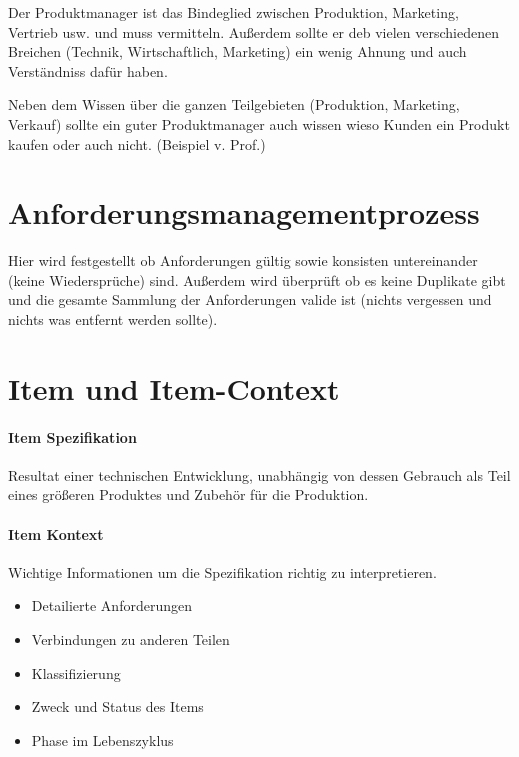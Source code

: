 
Der Produktmanager ist das Bindeglied zwischen Produktion, Marketing, Vertrieb usw. und muss vermitteln. Außerdem sollte er deb vielen verschiedenen Breichen (Technik, Wirtschaftlich, Marketing) ein wenig Ahnung und auch Verständniss dafür haben.


Neben dem Wissen über die ganzen Teilgebieten (Produktion, Marketing, Verkauf) sollte ein guter Produktmanager auch wissen wieso Kunden ein Produkt kaufen oder auch nicht. (Beispiel v. Prof.)

\section{Anforderungsmanagementprozess}
Hier wird festgestellt ob Anforderungen gültig sowie konsisten untereinander (keine Wiedersprüche) sind. Außerdem wird überprüft ob es keine Duplikate gibt und die gesamte Sammlung der Anforderungen valide ist (nichts vergessen und nichts was entfernt werden sollte).


\section{Item und Item-Context}

\paragraph{Item Spezifikation}
Resultat einer technischen Entwicklung, unabhängig von dessen Gebrauch als Teil eines größeren Produktes und Zubehör für die Produktion.

\paragraph{Item Kontext}
Wichtige Informationen um die Spezifikation richtig zu interpretieren.
\begin{itemize}
\item Detailierte Anforderungen
\item Verbindungen zu anderen Teilen
\item Klassifizierung
\item Zweck und Status des Items
\item Phase im Lebenszyklus
\end{itemize}

